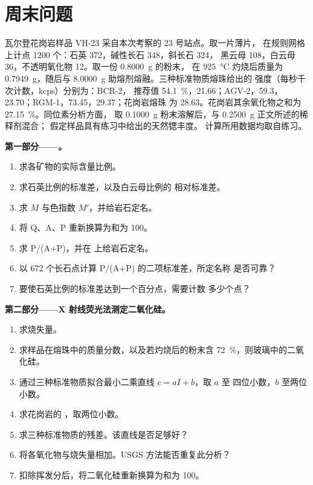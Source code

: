 \section*{周末问题}

\begin{problem}\label{pb:b2:field-lab-methods-2:1}
瓦尔登花岗岩样品 VH-23 采自本次考察的 23 号站点。取一片薄片，
在规则网格上计点 1200 个：石英 372，碱性长石 348，斜长石 324，
黑云母 108，白云母 36，不透明氧化物 12。取一份 \qty{0.8000}{g} 的粉末，
在 \qty{925}{\celsius} 灼烧后质量为 \qty{0.7949}{g}，随后与 \qty{8.0000}{g} 助熔剂熔融。三种标准物质熔珠给出的
 强度（每秒千次计数，kcps）分别为：BCR-2，
推荐值 \qty{54.1}{\percent}，21.66；AGV-2，59.3，23.70；RGM-1，73.45，29.37；花岗岩熔珠
为 28.63。花岗岩其余氧化物之和为 \qty{27.15}{\percent}。同位素分析方面，
取 \qty{0.1000}{g} 粉末溶解后，与 \qty{0.2500}{g} 正文所述的稀释剂混合；
假定样品具有练习中给出的天然锶丰度。
计算所用数据均取自练习。

\noindent\textbf{第一部分——。}
\begin{enumerate}
  \item 求各矿物的实际含量比例。
  \item 求石英比例的标准差，以及白云母比例的
        相对标准差。
  \item 求 $M$ 与色指数 $M'$，并给岩石定名。
  \item 将 Q、A、P 重新换算为和为 100。
  \item 求 P/(A+P)，并在 上给岩石定名。
  \item 以 672 个长石点计算 P/(A+P) 的二项标准差，所定名称
        是否可靠？
  \item 要使石英比例的标准差达到一个百分点，需要计数
        多少个点？
\end{enumerate}

\noindent\textbf{第二部分——X 射线荧光法测定二氧化硅。}
\begin{enumerate}[resume]
  \item 求烧失量。
  \item 求样品在熔珠中的质量分数，以及若灼烧后的粉末含
        \qty{72}{\percent}，则玻璃中的二氧化硅。
  \item 通过三种标准物质拟合最小二乘直线 $c = aI + b$，取 $a$ 至
        四位小数，$b$ 至两位小数。
  \item 求花岗岩的 ，取两位小数。
  \item 求三种标准物质的残差。该直线是否足够好？
  \item 将各氧化物与烧失量相加。USGS 方法能否重复此分析？
  \item 扣除挥发分后，将二氧化硅重新换算为和为 100。
\end{enumerate}


\end{problem}

